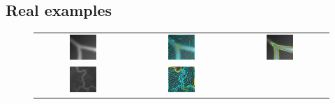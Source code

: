 \subsection{Real examples}
\begin{figure}[t]
\centering
\renewcommand{\tabcolsep}{0.05cm}
\begin{tabular}{@{}ccc@{}}
\includegraphics[width=0.3\textwidth]{images/L2S_compare/orig_1}	&
\includegraphics[width=0.3\textwidth]{images/L2S_compare/GAC_1}	&
\includegraphics[width=0.3\textwidth]{images/L2S_compare/CV_1}	\\
\includegraphics[width=0.3\textwidth]{images/L2S_compare/orig_4}	&
\includegraphics[width=0.3\textwidth]{images/L2S_compare/GAC_4}	&

\end{tabular}
\end{figure}
